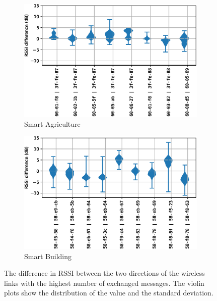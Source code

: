 \documentclass{elsarticle}
\newcommand{\building}            {Smart Building\xspace}
\newcommand{\agri}                {Smart Agriculture\xspace}
\begin{document}
\begin{figure}
    \centering
    \begin{subfigure}[h]{0.49\textwidth}
        \includegraphics[width=\columnwidth]{asymmetry_agri.eps}
        \caption{\agri}
    \end{subfigure}
    \centering
    \begin{subfigure}[h]{0.49\textwidth}
         \includegraphics[width=\columnwidth]{asymmetry_building.eps}
        \caption{\building}
    \end{subfigure}
    \caption{
        The difference in RSSI between the two directions of the wireless links with the highest number of exchanged messages.
        The violin plots show the distribution of the value and the standard deviation.
    }
    \label{fig:tab_symmetry}
\end{figure}

\end{document}

